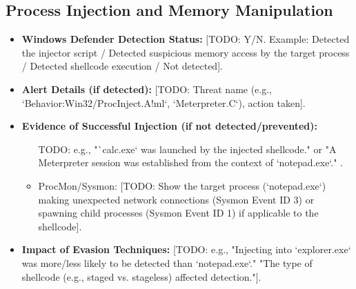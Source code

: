 \documentclass[11pt]{article}
\begin{document}
	\subsection{Process Injection and Memory Manipulation}
	\begin{itemize}
		\item \textbf{Windows Defender Detection Status:} [TODO: Y/N. Example: Detected the injector script / Detected suspicious memory access by the target process / Detected shellcode execution / Not detected].
		\item \textbf{Alert Details (if detected):} [TODO: Threat name (e.g., `Behavior:Win32/ProcInject.A!ml`, `Meterpreter.C`), action taken].
		\item \textbf{Evidence of Successful Injection (if not detected/prevented):}
		\begin{itemize}
			\item [TODO: e.g., "`calc.exe` was launched by the injected shellcode." or "A Meterpreter session was established from the context of `notepad.exe`."].
			\item ProcMon/Sysmon: [TODO: Show the target process (`notepad.exe`) making unexpected network connections (Sysmon Event ID 3) or spawning child processes (Sysmon Event ID 1) if applicable to the shellcode].
		\end{itemize}
		\item \textbf{Impact of Evasion Techniques:} [TODO: e.g., "Injecting into `explorer.exe` was more/less likely to be detected than `notepad.exe`." "The type of shellcode (e.g., staged vs. stageless) affected detection."].
	\end{itemize}
	
\end{document}
